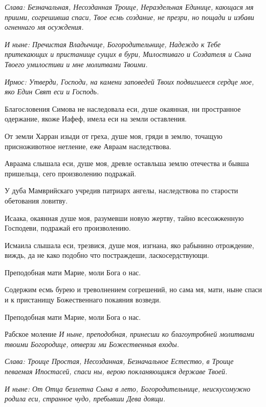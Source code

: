 \itshape Слава\normalfont{}: Безначальная, Несозданная Троице, Нераздельная Единице, кающася мя приими, согрешивша спаси, Твое есмь создание, не презри, но пощади и избави огненнаго мя осуждения. 

\itshape И ныне\normalfont{}: Пречистая Владычице, Богородительнице, Надеждо к Тебе притекающих и пристанище сущих в бури, Милостиваго и Создателя и Сына Твоего умилостиви и мне молитвами Твоими.


\itshape Ирмос\normalfont{}: Утверди, Господи, на камени заповедей Твоих подвигшееся сердце мое, яко Един Свят еси и Господь. 

Благословения Симова не наследовала еси, душе окаянная, ни пространное одержание, якоже Иафеф, имела еси на земли оставления. 

От земли Харран изыди от греха, душе моя, гряди в землю, точащую присноживотное нетление, еже Авраам наследствова. 

Авраама слышала еси, душе моя, древле оставльша землю отечества и бывша пришельца, сего произволению подражай. 

У дуба Мамврийскаго учредив патриарх ангелы, наследствова по старости обетования ловитву. 

Исаака, окаянная душе моя, разумевши новую жертву, тайно всесожженную Господеви, подражай его произволению. 

Исмаила слышала еси, трезвися, душе моя, изгнана, яко рабынино отрождение, виждь, да не како подобно что постраждеши, ласкосердствующи. 

Преподобная мати Марие, моли Бога о нас. 

Содержим есмь бурею и треволнением согрешений, но сама мя, мати, ныне спаси и к пристанищу Божественнаго покаяния возведи. 

Преподобная мати Марие, моли Бога о нас. 

Рабское моление \itshape И ныне\normalfont{}, преподобная, принесши ко благоутробней молитвами твоими Богородице, отверзи ми Божественныя входы. 

\itshape Слава\normalfont{}: Троице Простая, Несозданная, Безначальное Естество, в Троице певаемая Ипостасей, спаси ны, верою покланяющияся державе Твоей. 

\itshape И ныне\normalfont{}: От Отца безлетна Сына в лето, Богородительнице, неискусомужно родила еси, странное чудо, пребывши Дева доящи. 


